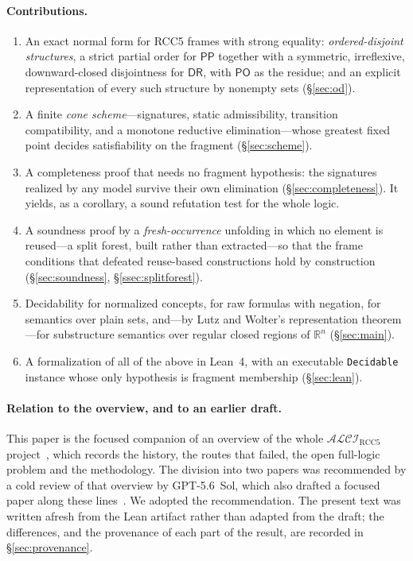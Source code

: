 \documentclass[11pt]{article}
\newcommand{\ALCIRCC}[1]{\mathcal{ALCI}_{\mathrm{RCC#1}}}
\newcommand{\DR}{\mathsf{DR}}
\newcommand{\PO}{\mathsf{PO}}
\newcommand{\PP}{\mathsf{PP}}
\newcommand{\code}[1]{\texttt{#1}}
\newcommand{\reals}{\mathbb{R}}
\theoremstyle{plain}
\theoremstyle{definition}
\begin{document}
\paragraph{Contributions.}
\begin{enumerate}
  \item An exact normal form for RCC5 frames with strong equality:
    \emph{ordered-disjoint structures}, a strict partial order for $\PP$
    together with a symmetric, irreflexive, downward-closed disjointness for
    $\DR$, with $\PO$ as the residue; and an explicit representation of every
    such structure by nonempty sets (\S\ref{sec:od}).
  \item A finite \emph{cone scheme}---signatures, static admissibility,
    transition compatibility, and a monotone reductive elimination---whose
    greatest fixed point decides satisfiability on the fragment
    (\S\ref{sec:scheme}).
  \item A completeness proof that needs no fragment hypothesis: the
    signatures realized by any model survive their own elimination
    (\S\ref{sec:completeness}). It yields, as a corollary, a sound
    refutation test for the whole logic.
  \item A soundness proof by a \emph{fresh-occurrence} unfolding in which no
    element is reused---a split forest, built rather than extracted---so that
    the frame conditions that defeated reuse-based constructions hold by
    construction (\S\ref{sec:soundness}, \S\ref{ssec:splitforest}).
  \item Decidability for normalized concepts, for raw formulas with
    negation, for semantics over plain sets, and---by Lutz and Wolter's
    representation theorem---for substructure semantics over regular closed
    regions of $\reals^n$ (\S\ref{sec:main}).
  \item A formalization of all of the above in Lean~4, with an executable
    \code{Decidable} instance whose only hypothesis is fragment membership
    (\S\ref{sec:lean}).
\end{enumerate}

\paragraph{Relation to the overview, and to an earlier draft.} This paper is
the focused companion of an overview of the whole $\ALCIRCC{5}$
project~\cite{Overview}, which records the history, the routes that failed, the
open full-logic problem and the methodology. The division into two papers was
recommended by a cold review of that overview by GPT-5.6~Sol, which also
drafted a focused paper along these lines~\cite{GPT56SolReview}. We adopted the
recommendation. The present text was written afresh from the Lean artifact
rather than adapted from the draft; the differences, and the provenance of each
part of the result, are recorded in \S\ref{sec:provenance}.
\end{document}
